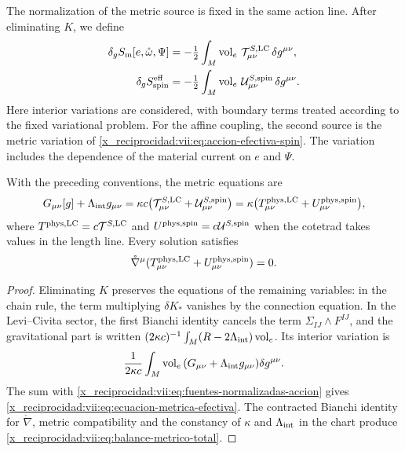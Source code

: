 \begin{HMTCompactSection}
The normalization of the metric source is fixed in the same action line. After eliminating \(K\), we define
\begin{align}
 \delta_g S_{\rm m}[e,\mathring\omega,\Psi]
 &=-\tfrac12\int_M\operatorname{vol}_e\,
                   \mathcal T^{S,\rm LC}_{\mu\nu}\,\delta g^{\mu\nu},
 \\
 \delta_g S_{\rm spin}^{\rm eff}
 &=-\tfrac12\int_M\operatorname{vol}_e\,
                   \mathcal U^{S,\rm spin}_{\mu\nu}\,\delta g^{\mu\nu}.
 \label{x_reciprocidad:vii:eq:fuentes-normalizadas-accion}
\end{align}
Here interior variations are considered, with boundary terms treated according to the fixed variational problem. For the affine coupling, the second source is the metric variation of \eqref{x_reciprocidad:vii:eq:accion-efectiva-spin}. The variation includes the dependence of the material current on \(e\) and \(\Psi\).

\begin{proposition}
\label{x_reciprocidad:vii:prop:fuente-metrica-balance}
With the preceding conventions, the metric equations are
\begin{equation}
 G_{\mu\nu}[g]+\Lambda_{\rm int}g_{\mu\nu}
 =\kappa c\bigl(\mathcal T^{S,\rm LC}_{\mu\nu}
                    +\mathcal U^{S,\rm spin}_{\mu\nu}\bigr)
 =\kappa\bigl(T^{\rm phys,LC}_{\mu\nu}
                    +U^{\rm phys,spin}_{\mu\nu}\bigr),
 \label{x_reciprocidad:vii:eq:ecuacion-metrica-efectiva}
\end{equation}
where \(T^{\rm phys,LC}=c\mathcal T^{S,\rm LC}\) and \(U^{\rm phys,spin}=c\mathcal U^{S,\rm spin}\) when the cotetrad takes values in the length line. Every solution satisfies
\begin{equation}
 \mathring\nabla^\mu
   (T^{\rm phys,LC}_{\mu\nu}+U^{\rm phys,spin}_{\mu\nu})=0.
 \label{x_reciprocidad:vii:eq:balance-metrico-total}
\end{equation}
\end{proposition}
\begin{proof}
Eliminating \(K\) preserves the equations of the remaining variables: in the chain rule, the term multiplying \(\delta K_*\) vanishes by the connection equation. In the Levi--Civita sector, the first Bianchi identity cancels the term \(\Sigma_{IJ}\wedge F^{IJ}\), and the gravitational part is written \((2\kappa c)^{-1}\int_M(R-2\Lambda_{\rm int})\operatorname{vol}_e\). Its interior variation is
\[
 \frac1{2\kappa c}\int_M\operatorname{vol}_e\,
        (G_{\mu\nu}+\Lambda_{\rm int}g_{\mu\nu})\delta g^{\mu\nu}.
\]
The sum with \eqref{x_reciprocidad:vii:eq:fuentes-normalizadas-accion} gives
\eqref{x_reciprocidad:vii:eq:ecuacion-metrica-efectiva}. The contracted Bianchi identity
for \(\mathring\nabla\), metric compatibility and
the constancy of \(\kappa\) and \(\Lambda_{\rm int}\) in the chart
produce \eqref{x_reciprocidad:vii:eq:balance-metrico-total}.
\end{proof}


\end{HMTCompactSection}
